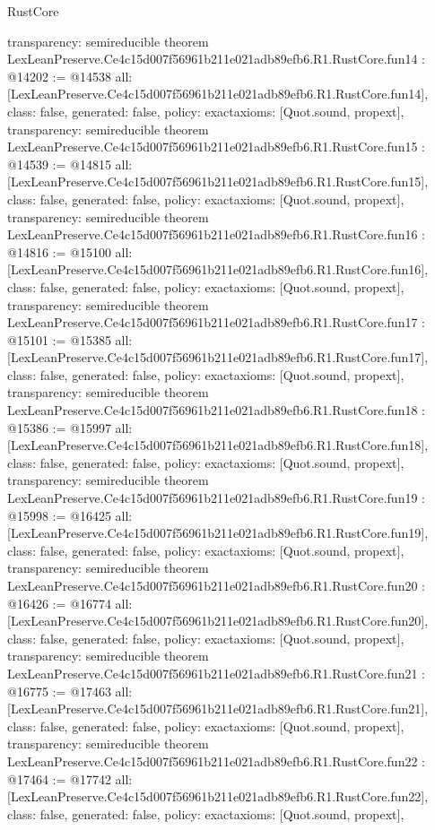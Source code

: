 \begin{lexlean}{RustCore}
\begin{coremodule}
{  transparency: semireducible
}
theorem LexLeanPreserve.Ce4c15d007f56961b211e021adb89efb6.R1.RustCore.fun14 : @14202 := @14538 {
  all: [LexLeanPreserve.Ce4c15d007f56961b211e021adb89efb6.R1.RustCore.fun14],
  class: false,
  generated: false,
  policy: exact{axioms: [Quot.sound, propext]},
  transparency: semireducible
}
theorem LexLeanPreserve.Ce4c15d007f56961b211e021adb89efb6.R1.RustCore.fun15 : @14539 := @14815 {
  all: [LexLeanPreserve.Ce4c15d007f56961b211e021adb89efb6.R1.RustCore.fun15],
  class: false,
  generated: false,
  policy: exact{axioms: [Quot.sound, propext]},
  transparency: semireducible
}
theorem LexLeanPreserve.Ce4c15d007f56961b211e021adb89efb6.R1.RustCore.fun16 : @14816 := @15100 {
  all: [LexLeanPreserve.Ce4c15d007f56961b211e021adb89efb6.R1.RustCore.fun16],
  class: false,
  generated: false,
  policy: exact{axioms: [Quot.sound, propext]},
  transparency: semireducible
}
theorem LexLeanPreserve.Ce4c15d007f56961b211e021adb89efb6.R1.RustCore.fun17 : @15101 := @15385 {
  all: [LexLeanPreserve.Ce4c15d007f56961b211e021adb89efb6.R1.RustCore.fun17],
  class: false,
  generated: false,
  policy: exact{axioms: [Quot.sound, propext]},
  transparency: semireducible
}
theorem LexLeanPreserve.Ce4c15d007f56961b211e021adb89efb6.R1.RustCore.fun18 : @15386 := @15997 {
  all: [LexLeanPreserve.Ce4c15d007f56961b211e021adb89efb6.R1.RustCore.fun18],
  class: false,
  generated: false,
  policy: exact{axioms: [Quot.sound, propext]},
  transparency: semireducible
}
theorem LexLeanPreserve.Ce4c15d007f56961b211e021adb89efb6.R1.RustCore.fun19 : @15998 := @16425 {
  all: [LexLeanPreserve.Ce4c15d007f56961b211e021adb89efb6.R1.RustCore.fun19],
  class: false,
  generated: false,
  policy: exact{axioms: [Quot.sound, propext]},
  transparency: semireducible
}
theorem LexLeanPreserve.Ce4c15d007f56961b211e021adb89efb6.R1.RustCore.fun20 : @16426 := @16774 {
  all: [LexLeanPreserve.Ce4c15d007f56961b211e021adb89efb6.R1.RustCore.fun20],
  class: false,
  generated: false,
  policy: exact{axioms: [Quot.sound, propext]},
  transparency: semireducible
}
theorem LexLeanPreserve.Ce4c15d007f56961b211e021adb89efb6.R1.RustCore.fun21 : @16775 := @17463 {
  all: [LexLeanPreserve.Ce4c15d007f56961b211e021adb89efb6.R1.RustCore.fun21],
  class: false,
  generated: false,
  policy: exact{axioms: [Quot.sound, propext]},
  transparency: semireducible
}
theorem LexLeanPreserve.Ce4c15d007f56961b211e021adb89efb6.R1.RustCore.fun22 : @17464 := @17742 {
  all: [LexLeanPreserve.Ce4c15d007f56961b211e021adb89efb6.R1.RustCore.fun22],
  class: false,
  generated: false,
  policy: exact{axioms: [Quot.sound, propext]},
}
\end{coremodule}
\end{lexlean}
